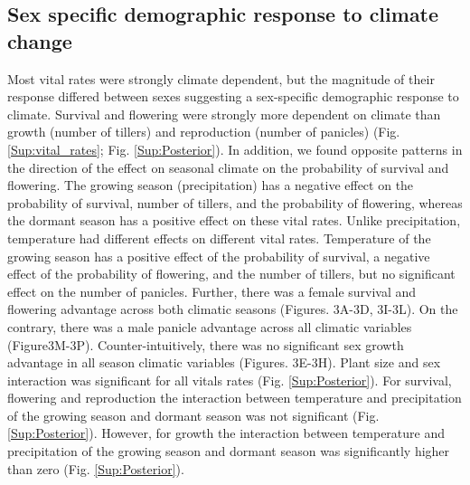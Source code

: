 \documentclass[12pt]{article}
\begin{document}
\subsection*{Sex specific demographic response to climate change}
Most vital rates were strongly climate dependent, but the magnitude of their response differed between sexes suggesting a sex-specific demographic response to climate. 
Survival and flowering were strongly more dependent on climate than growth (number of tillers) and reproduction (number of panicles) (Fig.\ref{Sup:vital_rates}; Fig. \ref{Sup:Posterior}).
In addition, we found opposite patterns in the direction of the effect on seasonal climate on the probability of survival and flowering.
The growing season (precipitation) has a negative effect on the probability of survival, number of tillers, and the probability of flowering, whereas the dormant season has a positive effect on these vital rates. 
Unlike precipitation, temperature had different effects on different vital rates.
Temperature of the growing season has a positive effect of the probability of survival, a negative effect of the probability of flowering, and the number of tillers, but no significant effect on the number of panicles. 
Further, there was a female survival and flowering advantage across both climatic seasons (Figures. 3A-3D, 3I-3L). 
On the contrary, there was a male panicle advantage across all climatic variables (Figure3M-3P). 
Counter-intuitively, there was no significant sex growth advantage in all season climatic variables (Figures. 3E-3H). 
Plant size and sex interaction was significant for all vitals rates (Fig. \ref{Sup:Posterior}).
For survival, flowering and reproduction the interaction between temperature and precipitation of the growing season and dormant season was not significant (Fig. \ref{Sup:Posterior}). 
However, for growth the interaction between temperature and precipitation of the growing season and dormant season was significantly higher than zero (Fig. \ref{Sup:Posterior}). 
\end{document}
